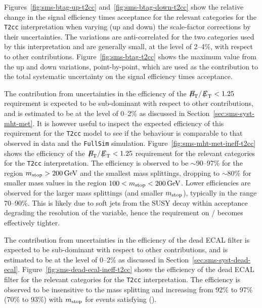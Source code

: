 Figures~\ref{fig:sms-btag-up-t2cc} and~\ref{fig:sms-btag-down-t2cc}
show the relative change in the signal efficiency times acceptance for
the relevant categories for the \verb!T2cc! interpretation when
varying (up and down) the scale-factor corrections by their
uncertainties. The variations are anti-correlated for the two \nb
categories used by this interpretation and are generally small, at the
level of 2--4\%, with respect to other contributions.
Figure~\ref{fig:sms-btag-t2cc} shows the maximum value from the up and
down variations, point-by-point, which are used as the contribution to
the total systematic uncertainty on the signal efficiency times
acceptance. 

The contribution from uncertainties in the efficiency of the
$\mht/\met < 1.25$ requirement is expected to be sub-dominant with
respect to other contributions, and is estimated to be at the level of
0--2\% as discussed in Section~\ref{sec:sms-syst-mht-met}. It is
however useful to inspect the expected efficiency of this requirement
for the \verb!T2cc! model to see if the behaviour is comparable to
that observed in data and the \verb!FullSim!
simulation. Figure~\ref{fig:sms-mht-met-ineff-t2cc} shows the
efficiency of the $\mht/\met < 1.25$ requirement for the relevant
categories for the \verb!T2cc! interpretation. The efficiency is
observed to be $\sim$90--97\% for the region $m_{\rm stop} > 200\,\text{Ge\hspace{-.08em}V}$
and the smallest mass splittings, dropping to $\sim$80\% for smaller
mass values in the region $100 < m_{\rm stop} < 200\,\text{Ge\hspace{-.08em}V}$. Lower
efficiencies are observed for the larger mass splittings (and smaller
$m_{\rm stop}$), typically in the range 70--90\%. This is likely due
to soft jets from the SUSY decay within acceptance degrading the
resolution of the \mht variable, hence the requirement on \mht/\met
becomes effectively tighter.

The contribution from uncertainties in the efficiency of the dead ECAL
filter is expected to be sub-dominant with respect to other
contributions, and is estimated to be at the level of 0--2\% as
discussed in Section~\ref{sec:sms-syst-dead-ecal}.
Figure~\ref{fig:sms-dead-ecal-ineff-t2cc} shows the efficiency of the
dead ECAL filter for the relevant categories for the \verb!T2cc!
interpretation. The efficiency is observed to be insensitive to the
mass splitting and increasing from 92\% to 97\% (70\% to 93\%) with
$m_{\rm stop}$ for events satisfying \njetlow (\njethigh).


